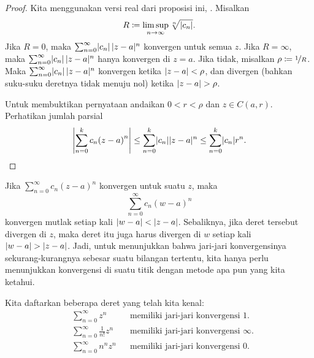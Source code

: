 \begin{proof}
Kita menggunakan versi real dari proposisi ini,
.
Misalkan
\begin{equation*}
R \coloneqq \limsup_{n\to\infty} \sqrt[n]{\lvert {c_n} \rvert} .
\end{equation*}
Jika $R = 0$, maka
$\sum_{n=0}^\infty \lvert {c_n} \rvert \, \lvert {z-a} \rvert^n$ konvergen untuk semua $z$.
Jika $R = \infty$, maka
$\sum_{n=0}^\infty \lvert {c_n} \rvert \, \lvert {z-a} \rvert^n$ hanya konvergen di $z=a$.
Jika tidak, misalkan $\rho \coloneqq \nicefrac{1}{R}$.
Maka
$\sum_{n=0}^\infty \lvert {c_n} \rvert \, \lvert {z-a} \rvert^n$ konvergen ketika
$\lvert {z-a} \rvert < \rho$, dan divergen (bahkan suku-suku deretnya
tidak menuju nol) ketika $\lvert {z-a} \rvert > \rho$.

Untuk membuktikan pernyataan  andaikan
$0 < r < \rho$ dan $z \in C(a,r)$.  Perhatikan
jumlah parsial
\begin{equation*}
\left\lvert {\sum_{n=0}^k c_n {(z-a)}^n} \right\rvert
\leq
\sum_{n=0}^k \lvert {c_n} \rvert \lvert {z-a} \rvert^n
\leq
\sum_{n=0}^k \lvert {c_n} \rvert r^n . \qedhere
\end{equation*}
\end{proof}

Jika $\sum_{n=0}^\infty c_n {(z-a)}^n$ konvergen untuk suatu $z$, maka
\begin{equation*}
\sum_{n=0}^\infty c_n {(w-a)}^n
\end{equation*}
konvergen mutlak setiap kali $\lvert {w-a} \rvert < \lvert {z-a} \rvert$.
Sebaliknya, jika deret tersebut divergen di $z$, maka deret itu juga harus divergen di $w$
setiap kali $\lvert {w-a} \rvert > \lvert {z-a} \rvert$.
Jadi, untuk menunjukkan
bahwa jari-jari konvergensinya sekurang-kurangnya sebesar suatu bilangan tertentu, kita hanya perlu
menunjukkan konvergensi di suatu titik dengan metode apa pun yang kita ketahui.

\begin{example}
Kita daftarkan beberapa deret yang telah kita kenal:
\begin{align*}
& &
& \sum_{n=0}^\infty z^n
& & \text{memiliki jari-jari konvergensi } 1.
& &
\\
& &
& \sum_{n=0}^\infty \frac{1}{n!} z^n
& & \text{memiliki jari-jari konvergensi } \infty.
& &
\\
& &
& \sum_{n=0}^\infty n^n z^n
& & \text{memiliki jari-jari konvergensi } 0.
& &
\end{align*}
\end{example}

